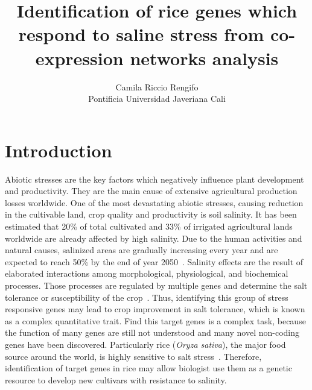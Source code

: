\documentclass[journal, onecolumn]{IEEEtran}
\title{Identification of rice genes which respond to saline stress from co-expression networks analysis}
\author{Camila Riccio Rengifo\\
  \small Pontificia Universidad Javeriana Cali\\
}
\begin{document}
\maketitle


\section*{Introduction}
Abiotic stresses are the key factors which negatively influence plant development and productivity. They are the main cause of extensive agricultural production losses worldwide. One of the most devastating abiotic stresses, causing reduction in the cultivable land, crop quality and productivity is soil salinity. It has been estimated that 20\% of total cultivated and 33\% of irrigated agricultural lands worldwide are already affected by high salinity. Due to the human activities and natural causes, salinized areas are gradually increasing every year and are expected to reach 50\% by the end of year 2050~\cite{shrivastava2015soil}. Salinity effects are the result of elaborated interactions among morphological, physiological, and biochemical processes. Those processes are regulated by multiple genes and determine the salt tolerance or susceptibility of the crop~\cite{reddy2017salt}. Thus, identifying this group of stress responsive genes may lead to crop improvement in salt tolerance, which is known as a complex quantitative trait. Find this target genes is a complex task, because the function of many genes are still not understood and many novel non-coding genes have been discovered. Particularly rice (\textit{Oryza sativa}), the major food source around the world, is highly sensitive to salt stress~\cite{chang2019morphological}. Therefore, identification of target genes in rice may allow biologist use them as a genetic resource to develop new cultivars with resistance to salinity.\\
\end{document}
